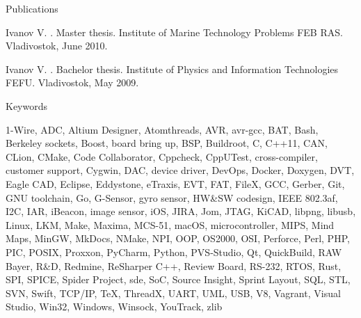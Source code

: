 \documentclass{template}
\begin{document}

\begin{rSection}{Publications}
\begin{rItemize}

\item Ivanov V. . Master thesis. \newline
      Institute of Marine Technology Problems FEB RAS. Vladivostok, June 2010.
\item Ivanov V. . Bachelor thesis. \newline
      Institute of Physics and Information Technologies FEFU. Vladivostok, May 2009.

\end{rItemize}
\end{rSection}


\begin{rSection}{Keywords}

1-Wire, ADC, Altium Designer, Atomthreads, AVR, avr-gcc, BAT, Bash, Berkeley sockets, Boost, board bring up, BSP, Buildroot, C, C++11, CAN,
CLion, CMake, Code Collaborator, Cppcheck, CppUTest, cross-compiler, customer support, Cygwin, DAC, device driver, DevOps, Docker, Doxygen, DVT, Eagle CAD, Eclipse,
Eddystone, eTraxis, EVT, FAT, FileX, GCC, Gerber, Git, GNU toolchain, Go, G-Sensor, gyro sensor, HW\&SW codesign, IEEE 802.3af, I2C, IAR, iBeacon,
image sensor, iOS, JIRA, Jom, JTAG, KiCAD, libpng, libusb, Linux, LKM, Make, Maxima, MCS-51, macOS, microcontroller, MIPS, Mind Maps, MinGW,
MkDocs, NMake, NPI, OOP, OS2000, OSI, Perforce, Perl, PHP, PIC, POSIX, Proxxon, PyCharm, Python, PVS-Studio, Qt, QuickBuild, RAW Bayer, R\&D, Redmine, ReSharper
C++, Review Board, RS-232, RTOS, Rust, SPI, SPICE, Spider Project, sde, SoC, Source Insight, Sprint Layout, SQL, STL, SVN, Swift, TCP/IP, \TeX,
ThreadX, UART, UML, USB, V8, Vagrant, Visual Studio, Win32, Windows, Winsock, YouTrack, zlib

\end{rSection}

\end{document}
